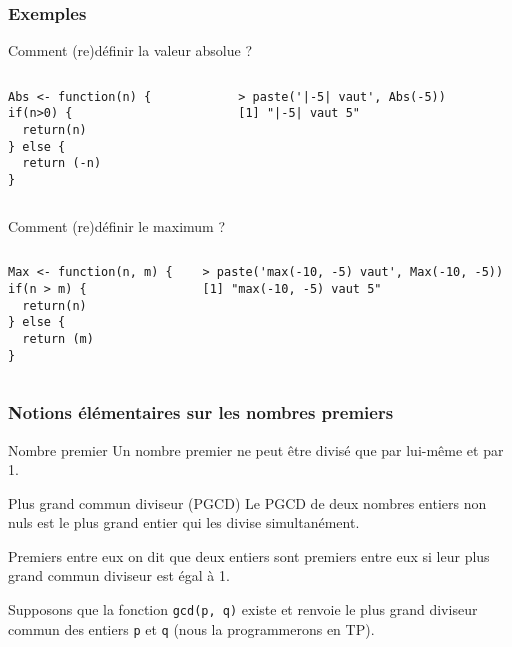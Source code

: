\documentclass[10pt]{beamer}
\begin{document}
\begin{frame}[fragile]
  \frametitle{Exemples}

  \begin{exampleblock}{Comment (re)définir la valeur absolue ?}
\begin{columns}[c]
\begin{column}{0.38\textwidth}
  \begin{lstlisting}[style=edblock]
Abs <- function(n) {
if(n>0) {
  return(n)
} else {
  return (-n)
}
\end{lstlisting}
\end{column}
\begin{column}{0.62\textwidth}
  \begin{lstlisting}
> paste('|-5| vaut', Abs(-5))
[1] "|-5| vaut 5"    
  \end{lstlisting}
\end{column}
\end{columns}
\end{exampleblock}

  \begin{exampleblock}{Comment (re)définir le maximum ?}
\begin{columns}[c]
\begin{column}{0.38\textwidth}
  \begin{lstlisting}[style=edblock]
Max <- function(n, m) {
if(n > m) {
  return(n)
} else {
  return (m)
}
\end{lstlisting}
\end{column}
\begin{column}{0.62\textwidth}
  \begin{lstlisting}
> paste('max(-10, -5) vaut', Max(-10, -5))
[1] "max(-10, -5) vaut 5"    
  \end{lstlisting}
\end{column}
\end{columns}
  \end{exampleblock}


\end{frame}


\begin{frame}
  \frametitle{Notions élémentaires sur les nombres premiers}
  \begin{block}{Nombre premier}
    Un nombre premier ne peut être divisé que par lui-même et par 1.
  \end{block}
  \begin{block}{Plus grand commun diviseur (PGCD)}
    Le PGCD de deux nombres entiers non nuls est le plus grand entier qui les divise simultanément. 
  \end{block}

  \begin{block}{Premiers entre eux}
    on dit que deux entiers sont premiers entre eux si leur plus grand commun diviseur est égal à 1.
  \end{block}

  Supposons que la fonction \texttt{gcd(p, q)} existe et renvoie le plus grand diviseur commun des entiers \texttt{p} et \texttt{q} (nous la programmerons en TP).
\end{frame}
\end{document}
